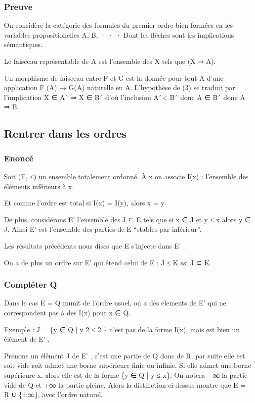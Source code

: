 \documentclass[11pt]{article}
\begin{document}
\subsubsection{Preuve}
\label{sec-1-2-2}

On considère la catégorie des formules du premier ordre bien formées en les variables propositionelles A, B, · · · Dont les flèches sont les implications sémantiques.

Le faisceau représentable de A est l’ensemble des X tels que (X ⇒ A).

Un morphisme de faisceau entre F et G est la donnée pour tout A d’une application F (A) → G(A) naturelle en A.
L’hypothèse de (3) se traduit par l’implication X ∈ Aˆ ⇒ X ∈ Bˆ d'où l'inclusion Aˆ< Bˆ donc A ∈ Bˆ donc A ⇒ B.
\subsection{Rentrer dans les ordres}
\label{sec-1-3}
\subsubsection{Enoncé}
\label{sec-1-3-1}

Soit (E, ≤) un ensemble totalement ordonné. À x on associe I(x) : l’ensemble des éléments inférieurs à x.

Et comme l’ordre est total si I(x) = I(y), alors x = y

De plus, considérons E' l’ensemble des J ⊆ E tels que si x ∈ J et y ≤ x alors
y ∈ J. Ainsi E' est l’ensemble des parties de E ``stables par inférieur''.

Les résultats précédents nous dises que E s’injecte dans E' .

On a de plus un ordre sur E' qui étend celui de E : J ≤ K ssi J ⊂ K.
\subsubsection{Compléter Q}
\label{sec-1-3-2}

Dans le cas E = Q munit de l’ordre usuel, on a des elements de E' qui ne correspondent pas à des I(x) pour x ∈ Q.

Exemple : J = \{y ∈ Q | y 2 ≤ 2 \} n’est pas de la forme I(x), mais est bien un élément de E' .

Prenons un élément J de E' , c’est une partie de Q donc de R, par suite elle est soit vide soit admet une borne supérieure finie ou infinie. Si elle admet une borne supérieure x, alors elle est de la forme \{y ∈ Q | y ≤ x\}.
On notera −∞ la partie vide de Q et +∞ la partie pleine.
Alors la distinction ci-dessus montre que E = R ∪ \{±∞\}, avec l’ordre naturel.
\end{document}
